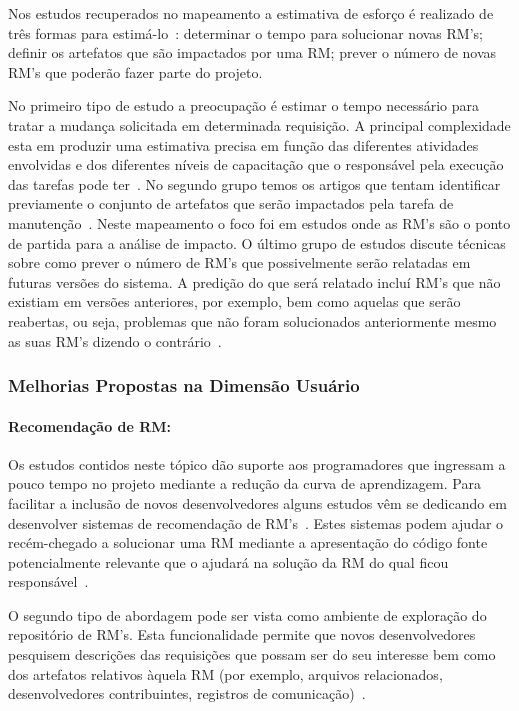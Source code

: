 Nos estudos recuperados no mapeamento a estimativa de esforço é realizado de
três formas para estimá-lo~\cite{cavalcanti2014challenges}: determinar o tempo
para solucionar novas RM's; definir os artefatos que são impactados por uma
RM\@; prever o número de novas RM's que poderão fazer parte do projeto.

No primeiro tipo de estudo a preocupação é estimar o tempo necessário para
tratar a mudança solicitada em determinada requisição. A principal complexidade
esta em produzir uma estimativa precisa em função das diferentes atividades
envolvidas e dos diferentes níveis de capacitação que o responsável pela
execução das tarefas pode ter~\cite{xia2015automatic}. No segundo grupo temos os
artigos que tentam identificar previamente o conjunto de artefatos que serão
impactados pela tarefa de manutenção~\cite{Nagwani2010}.  Neste mapeamento o
foco foi em estudos onde as RM's são o ponto de partida para a análise de
impacto. O último grupo de estudos discute técnicas sobre como prever o número
de RM's que possivelmente serão relatadas em futuras versões do sistema. A
predição do que será relatado incluí RM's que não existiam em versões
anteriores, por exemplo, bem como aquelas que serão reabertas, ou seja,
problemas que não foram solucionados anteriormente mesmo as suas RM's dizendo o
contrário~\cite{xia2015automatic}.

\subsubsection{Melhorias Propostas na Dimensão Usuário}
\label{ssub:melhorias_dim_usuario}

\paragraph{Recomendação de RM:} Os estudos contidos neste tópico dão suporte aos
programadores que ingressam a pouco tempo no projeto mediante a redução da curva
de aprendizagem. Para facilitar a inclusão de novos desenvolvedores alguns
estudos vêm se dedicando em desenvolver sistemas de recomendação de
RM's~\cite{malheiros2012source, Wang2011bug}. Estes sistemas podem ajudar o
recém-chegado a solucionar uma RM mediante a apresentação do código fonte
potencialmente relevante que o ajudará na solução da RM do qual ficou
responsável~\cite{malheiros2012source}.

O segundo tipo de abordagem pode ser vista como ambiente de exploração do
repositório de RM's. Esta funcionalidade permite que novos desenvolvedores
pesquisem descrições das requisições que possam ser do seu interesse bem como
dos artefatos relativos àquela RM (por exemplo, arquivos relacionados,
desenvolvedores contribuintes, registros de comunicação)~\cite{Wang2011bug}.

